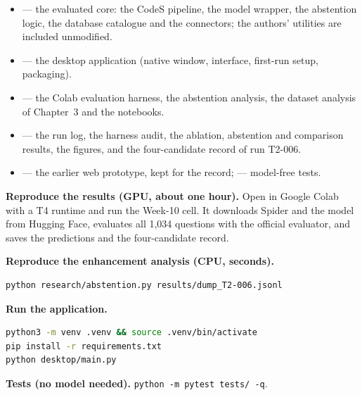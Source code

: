 \begin{itemize}
	\item {} --- the evaluated core: the CodeS pipeline, the model wrapper, the abstention logic, the database catalogue and the connectors; the authors' utilities are included unmodified.
	\item {} --- the desktop application (native window, interface, first-run setup, packaging).
	\item {} --- the Colab evaluation harness, the abstention analysis, the dataset analysis of Chapter~3 and the notebooks.
	\item {} --- the run log, the harness audit, the ablation, abstention and comparison results, the figures, and the four-candidate record of run T2-006.
	\item {} --- the earlier web prototype, kept for the record;  --- model-free tests.
\end{itemize}

\textbf{Reproduce the results (GPU, about one hour).} Open  in Google Colab with a T4 runtime and run the Week-10 cell. It downloads Spider and the model from Hugging Face, evaluates all 1,034 questions with the official evaluator, and saves the predictions and the four-candidate record.

\textbf{Reproduce the enhancement analysis (CPU, seconds).}
\begin{lstlisting}[language=bash, caption={Significance tests, operating points and the accuracy--coverage figure}]
python research/abstention.py results/dump_T2-006.jsonl
\end{lstlisting}

\textbf{Run the application.}
\begin{lstlisting}[language=bash, caption=Running QueryGenie from source]
python3 -m venv .venv && source .venv/bin/activate
pip install -r requirements.txt
python desktop/main.py
\end{lstlisting}

\textbf{Tests (no model needed).} \texttt{python -m pytest tests/ -q}.
